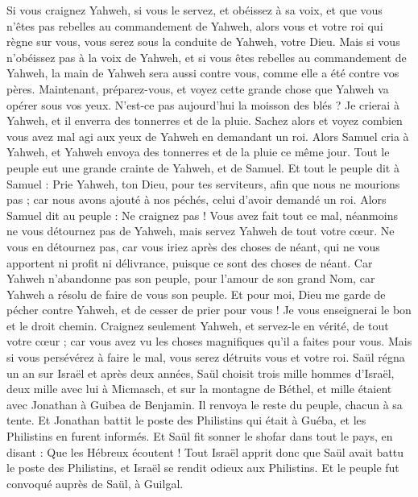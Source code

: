 \begin{multicols}{2}
Si vous craignez Yahweh, si vous le servez, et obéissez à sa voix, et que vous n'êtes pas rebelles au commandement de Yahweh, alors vous et votre roi qui règne sur vous, vous serez sous la conduite de Yahweh, votre Dieu.
Mais si vous n'obéissez pas à la voix de Yahweh, et si vous êtes rebelles au commandement de Yahweh, la main de Yahweh sera aussi contre vous, comme elle a été contre vos pères.
Maintenant, préparez-vous, et voyez cette grande chose que Yahweh va opérer sous vos yeux.
N'est-ce pas aujourd'hui la moisson des blés ? Je crierai à Yahweh, et il enverra des tonnerres et de la pluie. Sachez alors et voyez combien vous avez mal agi aux yeux de Yahweh en demandant un roi.
Alors Samuel cria à Yahweh, et Yahweh envoya des tonnerres et de la pluie ce même jour. Tout le peuple eut une grande crainte de Yahweh, et de Samuel.
Et tout le peuple dit à Samuel : Prie Yahweh, ton Dieu, pour tes serviteurs, afin que nous ne mourions pas ; car nous avons ajouté à nos péchés, celui d'avoir demandé un roi.
Alors Samuel dit au peuple : Ne craignez pas ! Vous avez fait tout ce mal, néanmoins ne vous détournez pas de Yahweh, mais servez Yahweh de tout votre cœur.
Ne vous en détournez pas, car vous iriez après des choses de néant, qui ne vous apportent ni profit ni délivrance, puisque ce sont des choses de néant.
Car Yahweh n'abandonne pas son peuple, pour l'amour de son grand Nom, car Yahweh a résolu de faire de vous son peuple.
Et pour moi, Dieu me garde de pécher contre Yahweh, et de cesser de prier pour vous ! Je vous enseignerai le bon et le droit chemin.
Craignez seulement Yahweh, et servez-le en vérité, de tout votre cœur ; car vous avez vu les choses magnifiques qu'il a faites pour vous.
Mais si vous persévérez à faire le mal, vous serez détruits vous et votre roi.
\VerseOne{}Saül régna un an sur Israël et après deux années,
Saül choisit trois mille hommes d'Israël, deux mille avec lui à Micmasch, et sur la montagne de Béthel, et mille étaient avec Jonathan à Guibea de Benjamin. Il renvoya le reste du peuple, chacun à sa tente.
Et Jonathan battit le poste des Philistins qui était à Guéba, et les Philistins en furent informés. Et Saül fit sonner le shofar dans tout le pays, en disant : Que les Hébreux écoutent !
Tout Israël apprit donc que Saül avait battu le poste des Philistins, et Israël se rendit odieux aux Philistins. Et le peuple fut convoqué auprès de Saül, à Guilgal.

\end{multicols}
